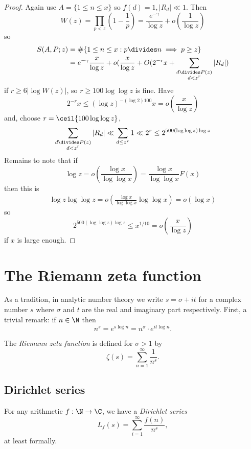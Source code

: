 \documentclass[a4paper]{article}
\begin{document}
\begin{proof}
  Again use \(A = \{1 \leq n \leq x\}\) so \(f(d) = 1, |R_d| \ll 1\). Then
  \[
    W(z)
    = \prod_{p < z} (1 - \frac{1}{p})
    = \frac{e^{-\gamma}}{\log z} + o(\frac{1}{\log z})
  \]
  so
  \begin{align*}
    S(A, P; z)
    &= \#\{1 \leq n \leq x: p \divides n \implies p \geq z\} \\
    &= e^{-\gamma} \frac{x}{\log z} + o(\frac{x}{\log z} + O(2^{-r} x + \sum_{\substack{d \divides P(z) \\ d < z^r}} |R_d|)
  \end{align*}
  if \(r \geq 6 |\log W(z)|\), so \(r \geq 100 \log \log z\) is fine. Have
  \[
    2^{-r} x \leq (\log z)^{- (\log 2) 100} x = o(\frac{x}{\log z})
  \]
  and, choose \(r = \ceil{100 \log \log z}\),
  \[
    \sum_{\substack{d \divides P(z) \\ d < z^r}} |R_d|
    \ll \sum_{d \leq z^r} 1
    \ll 2^r
    \leq 2^{500 (\log \log z) \log z}
  \]
  Remains to note that if
  \[
    \log z = o(\frac{\log x}{\log \log x}) = \frac{\log x}{\log \log x} F(x)
  \]
  then this is
  \begin{align*}
    \log z \log \log z
    = o( \frac{\log x}{\log \log x} \log \log x)
    = o(\log x)
  \end{align*}
  so
  \[
    2^{500 (\log \log z) \log z} \leq x^{1/10} = o(\frac{x}{\log z})
  \]
  if \(x\) is large enough.
\end{proof}

\section{The Riemann zeta function}

As a tradition, in analytic number theory we write \(s = \sigma + it\) for a complex number \(s\) where \(\sigma\) and \(t\) are the real and imaginary part respectively. First, a trivial remark: if \(n \in \N\) then
\[
  n^s = e^{s \log n} = n^\sigma \cdot e^{it \log n}.
\]

The \emph{Riemann zeta function} is defined for \(\sigma > 1\) by
\[
  \zeta(s) = \sum_{n = 1}^\infty \frac{1}{n^s}.
\]

\subsection{Dirichlet series}

For any arithmetic \(f: \N \to \C\), we have a \emph{Dirichlet series}
\[
  L_f(s) = \sum_{i = 1}^\infty \frac{f(n)}{n^s},
\]
at least formally.
\end{document}
